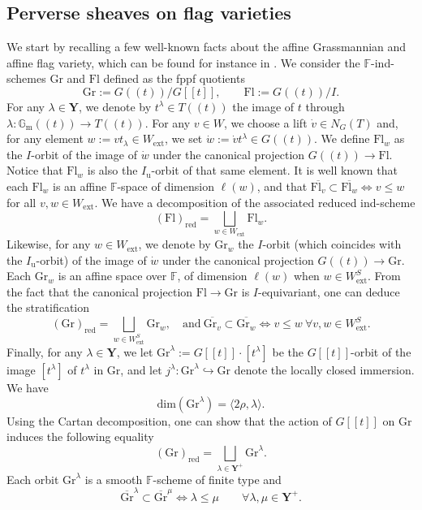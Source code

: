 \documentclass[11pt]{amsart}
\theoremstyle{plain}
\theoremstyle{remark}
\numberwithin{equation}{section}
\begin{document}
	\subsection{Perverse sheaves on flag varieties}\label{section The affine Grassmannian and the affine flag variety} We start by recalling a few well-known facts about the affine Grassmannian and affine flag variety, which can be found for instance in \cite{MR1961134}. We consider the $\mathbb{F}$-ind-schemes $\mathrm{Gr}$ and $\mathrm{Fl}$ defined as the fppf quotients
	$$\mathrm{Gr}:=G((t))/G[[t]],\qquad\mathrm{Fl}:=G((t))/I. $$
	For any $\lambda\in\mathbf{Y}$, we denote by $t^\lambda\in T((t))$ the image of $t$ through $\lambda:\mathbb{G}_\mathrm{m}((t))\to T((t))$. For any $v\in W$, we choose a lift $\dot{v}\in N_G(T)$ and, for any element $w:=vt_\lambda\in W_\mathrm{ext}$, we set $\dot{w}:=\dot{v}t^\lambda\in G((t))$. We define $\mathrm{Fl}_w$ as the $I$-orbit of the image of $\dot{w}$ under the canonical projection $G((t))\to\mathrm{Fl}$. Notice that $\mathrm{Fl}_w$ is also the $I_\mathrm{u}$-orbit of that same element. It is well known that each $\mathrm{Fl}_w$ is an affine $\mathbb{F}$-space of dimension $\ell(w)$, and that $\overline{\mathrm{Fl}_v}\subset \overline{\mathrm{Fl}_w}\Leftrightarrow v\leq w$ for all $v,w\in W_\mathrm{ext}$. We have a decomposition of the associated reduced ind-scheme
	$$(\mathrm{Fl})_{\mathrm{red}}=\bigsqcup_{w\in W_\mathrm{ext}}\mathrm{Fl}_w.$$
	Likewise, for any $w\in W_\mathrm{ext}$, we denote by $\mathrm{Gr}_w$ the $I$-orbit (which coincides with the $I_\mathrm{u}$-orbit) of the image of $\dot{w}$ under the canonical projection $G((t))\to\mathrm{Gr}$. Each $\mathrm{Gr}_w$ is an affine space over $\mathbb{F}$, of dimension $\ell(w)$ when $w\in W_\mathrm{ext}^S$.  From the fact that the canonical projection $\mathrm{Fl}\to \mathrm{Gr}$ is $I$-equivariant, one can deduce the stratification
	$$(\mathrm{Gr})_{\mathrm{red}}=\bigsqcup_{w\in W_\mathrm{ext}^S}\mathrm{Gr}_w,\quad\text{and}~\overline{\mathrm{Gr}_v}\subset \overline{\mathrm{Gr}_w}\Leftrightarrow v\leq w ~\forall v,w\in W_\mathrm{ext}^S.$$
	Finally, for any $\lambda\in \mathbf{Y}$, we let $\mathrm{Gr}^\lambda:=G[[t]]\cdot[t^\lambda]$ be the $G[[t]]$-orbit of the image $[t^\lambda]$ of $t^\lambda$ in $\mathrm{Gr}$, and let $j^\lambda:\mathrm{Gr}^\lambda\hookrightarrow\mathrm{Gr}$ denote the locally closed immersion. We have 
	$$\mathrm{dim}(\mathrm{Gr}^\lambda)=\langle2\rho,\lambda\rangle.$$
	Using the Cartan decomposition, one can show that the action of $G[[t]]$ on $\mathrm{Gr}$ induces the following equality
	$$(\mathrm{Gr})_{\mathrm{red}}=\bigsqcup_{\lambda\in \mathbf{Y}^+}\mathrm{Gr}^\lambda.$$
	Each orbit $\mathrm{Gr}^\lambda$ is a smooth $\mathbb{F}$-scheme of finite type and
	$$\overline{\mathrm{Gr}}^\lambda\subset \overline{\mathrm{Gr}}^\mu \Leftrightarrow \lambda\leq\mu\qquad\forall\lambda,\mu\in \mathbf{Y}^+.$$
	
\end{document}
